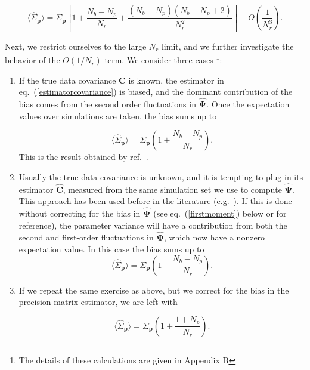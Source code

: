 \documentclass[reprint,aps,prd,superscriptaddress,showkeys,showpacs]{revtex4-1}
\newcommand{\bb}[1]{\mathbf{#1}}
\newcommand{\bbh}[1]{\mathbf{\hat{#1}}}
\newcommand{\h}[1]{\hat{#1}}
\begin{document}
\begin{widetext}
\begin{equation}
\label{quarticdegradation}
\langle\h{\Sigma}_\bb{p}\rangle = \Sigma_\bb{p}\left[1+\frac{N_b-N_p}{N_r}+\frac{(N_b-N_p)(N_b-N_p+2)}{N_r^2}\right] + O\left(\frac{1}{N_r^3}\right).
\end{equation}
\end{widetext}
%
Next, we restrict ourselves to the large $N_r$ limit, and we further
investigate the behavior of the $O(1/N_r)$ term. We consider three
cases \footnote{The details of these calculations are given in Appendix B}:


\begin{enumerate}
\item If the true data covariance $\bb{C}$ is known, the estimator in eq.~(\ref{estimatorcovariance}) is biased, and the dominant contribution of the bias comes from the second order fluctuations in $\bbh{\Psi}$. Once the expectation values over simulations are taken, the bias sums up to

\begin{equation}
\label{dodelsonscaling}
\langle\h{\Sigma}_\bb{p}\rangle=\Sigma_\bb{p}\left(1+\frac{N_b-N_p}{N_r}\right).
\end{equation}
%
This is the result obtained by ref.~\citep{DodelsonSchneider13}.

\item Usually the true data covariance is unknown, and it is tempting to plug in its estimator $\bbh{C}$, measured from the same simulation set we use to compute $\bbh{\Psi}$. This approach has been used before in the literature (e.g.~\citep{MinkPetri,MinkShirasaki}). If this is done without correcting for the bias in $\bbh{\Psi}$ (see eq.~(\ref{firstmoment}) below or \citep{Taylor12} for reference), 
the parameter variance will have a contribution from both the second and first-order fluctuations in $\bbh{\Psi}$, which now have a nonzero expectation value. In this case the bias sums up to
%
\begin{equation}
\label{mockscalinguncorrected}
\langle\h{\Sigma}_\bb{p}\rangle=\Sigma_\bb{p}\left(1-\frac{N_b-N_p}{N_r}\right).
\end{equation}

\item If we repeat the same exercise as above, but we correct for the bias in the precision matrix estimator, we are left with

\begin{equation}
\label{mockscalingcorrected}
\langle\h{\Sigma}_\bb{p}\rangle=\Sigma_\bb{p}\left(1+\frac{1+N_p}{N_r}\right).
\end{equation}

\end{enumerate} 
\end{document}
